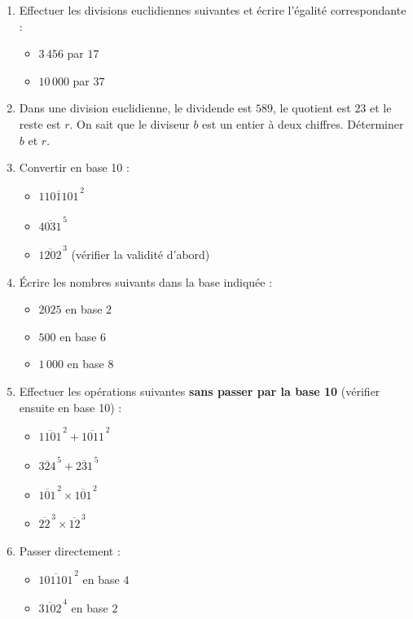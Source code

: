 \documentclass[11pt]{article}
\begin{document}
\begin{exercice}
\begin{enumerate}
\item Effectuer les divisions euclidiennes suivantes et écrire l'égalité correspondante :
      \begin{itemize}
      \item $3\,456$ par $17$
      \item $10\,000$ par $37$
      \end{itemize}
\item Dans une division euclidienne, le dividende est $589$, le quotient est $23$ et le reste est $r$. On sait que le diviseur $b$ est un entier à deux chiffres. Déterminer $b$ et $r$.
\item Convertir en base 10 :
      \begin{itemize}
      \item $\overline{1101101}^{\,2}$
      \item $\overline{4031}^{\,5}$
      \item $\overline{1202}^{\,3}$ (vérifier la validité d'abord)
      \end{itemize}
\item Écrire les nombres suivants dans la base indiquée :
      \begin{itemize}
      \item $2025$ en base $2$
      \item $500$ en base $6$
      \item $1\,000$ en base $8$
      \end{itemize}
\item Effectuer les opérations suivantes \textbf{sans passer par la base 10} (vérifier ensuite en base 10) :
      \begin{itemize}
      \item $\overline{1101}^{\,2} + \overline{1011}^{\,2}$
      \item $\overline{324}^{\,5} + \overline{231}^{\,5}$
      \item $\overline{101}^{\,2} \times \overline{101}^{\,2}$
      \item $\overline{22}^{\,3} \times \overline{12}^{\,3}$
      \end{itemize}
\item Passer directement :
      \begin{itemize}
      \item $\overline{101101}^{\,2}$ en base $4$
      \item $\overline{3102}^{\,4}$ en base $2$
      \end{itemize}
\end{enumerate}
\end{exercice}
\end{document}

